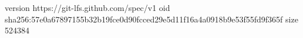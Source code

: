 version https://git-lfs.github.com/spec/v1
oid sha256:57e0a67897155b32b19fce0d90fcced29e5d11f16a4a0918b9e53f55fd9f365f
size 524384
